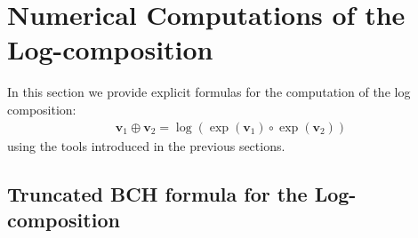 \section{Numerical Computations of the Log-composition}

In this section we provide explicit formulas for the computation of the log composition:
\begin{align}\label{eq:main_def_log_composition}
\mathbf{v}_{1}\oplus \mathbf{v}_{2} =  \log(\exp(\mathbf{v}_1)\circ \exp(\mathbf{v}_2))
\end{align}
using the tools introduced in the previous sections.

\subsection{Truncated BCH formula for the Log-composition}\label{se:bch_formula}

